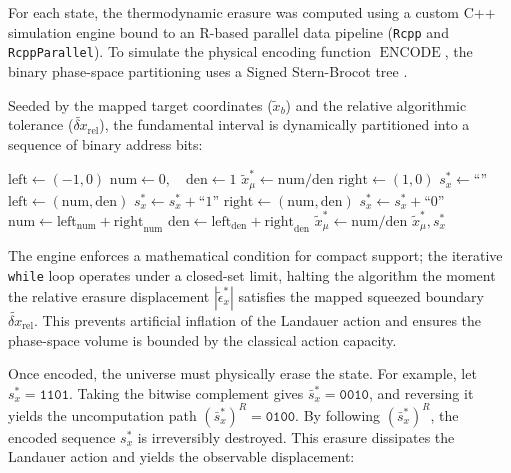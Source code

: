 \documentclass[%
  aps, reprint, prl, amsmath,amssymb
]{revtex4-2}
\begin{document}
 For each state, the thermodynamic erasure was computed using a custom C++ simulation engine bound to an R-based parallel data pipeline (\texttt{Rcpp} and \texttt{RcppParallel}). To simulate the physical encoding function $\operatorname{ENCODE}$, the binary phase-space partitioning uses a Signed Stern-Brocot tree \cite{ConcreteMath, Niqui2007}.

Seeded by the mapped target coordinates ($\tilde{x}_b$) and the relative algorithmic tolerance ($\widetilde{\delta x}_{\text{rel}}$), the fundamental interval is dynamically partitioned into a sequence of binary address bits:

\begin{algorithmic}[1]
    \State $\text{left} \gets (-1, 0)$
    \State $\text{num} \gets 0, \quad \text{den} \gets 1$
    \State $\tilde{x}_\mu^* \gets \text{num} / \text{den}$
    \State $\text{right} \gets (1, 0)$
    \State $s_x^* \gets \text{``''}$
            \State $\text{left} \gets (\text{num}, \text{den})$
            \State $s_x^* \gets s_x^* + \text{``1''}$
        \Else 
            \State $\text{right} \gets (\text{num}, \text{den})$
            \State $s_x^* \gets s_x^* + \text{``0''}$
        \EndIf
        \State $\text{num} \gets \text{left}_{\text{num}} + \text{right}_{\text{num}}$
        \State $\text{den} \gets \text{left}_{\text{den}} + \text{right}_{\text{den}}$
        \State $\tilde{x}_\mu^* \gets \text{num} / \text{den}$
    \EndWhile
    \State \Return $\tilde{x}_\mu^*, s_x^*$
\EndFunction
\end{algorithmic}

The engine enforces a mathematical condition for compact support; the iterative \texttt{while} loop operates under a closed-set limit, halting the algorithm the moment the relative erasure displacement $|\tilde{\epsilon}_x^*|$ satisfies the mapped squeezed boundary $\widetilde{\delta x}_{\text{rel}}$. This prevents artificial inflation of the Landauer action and ensures the phase-space volume is bounded by the classical action capacity. 

Once encoded, the universe must physically erase the state. For example, let $s_x^* = \mathtt{1101}$. Taking the bitwise complement gives $\bar{s}_x^* = \mathtt{0010}$, and reversing it yields the uncomputation path $(\bar{s}_x^*)^R = \mathtt{0100}$. By following $(\bar{s}_x^*)^R$, the encoded sequence $s_x^*$ is irreversibly destroyed. This erasure dissipates the Landauer action and yields the observable displacement:
\end{document}
